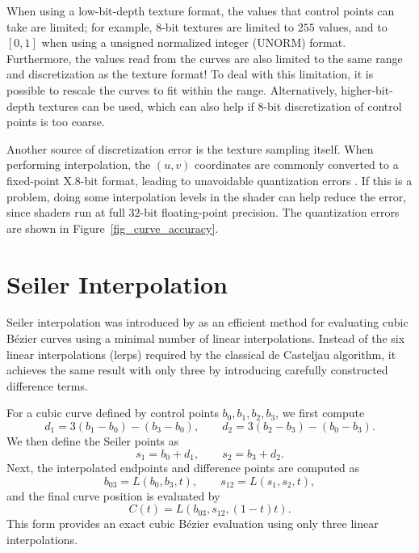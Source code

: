 \documentclass{jcgt}
\begin{document}
When using a low-bit-depth texture format, the values that control points can take are limited; for example, $8$-bit textures are limited to $255$ values, and to $[0,1]$ when using
a unsigned normalized integer (UNORM) format. Furthermore, the values read from the curves are also limited to the same range and discretization as the texture format! To deal with this limitation, it is possible to
rescale the curves to fit within the range. Alternatively, higher-bit-depth textures can be used, which can also help if $8$-bit discretization of control points is too coarse.

Another source of discretization error is the texture sampling itself. When performing interpolation, the $(u,v)$ coordinates are commonly converted to a fixed-point X.$8$-bit
format, leading to unavoidable quantization errors \cite{CUDA_PG}. If this is a problem, doing some interpolation levels in the shader can help reduce the error, since shaders run at full
$32$-bit floating-point precision. The quantization errors are shown in Figure~\ref{fig_curve_accuracy}.

\section{Seiler Interpolation}
Seiler interpolation was introduced by \citet{lin2021hardware} as an efficient method for evaluating cubic Bézier curves using a minimal number of linear interpolations. 
Instead of the six linear interpolations (lerps) required by the classical de Casteljau algorithm, it achieves the same result with only three by introducing carefully constructed difference terms.

For a cubic curve defined by control points \(b_0, b_1, b_2, b_3\), we first compute
\[
d_1 = 3(b_1 - b_0) - (b_3 - b_0), \qquad
d_2 = 3(b_2 - b_3) - (b_0 - b_3).
\]
We then define the Seiler points as
\[
s_1 = b_0 + d_1, \qquad s_2 = b_3 + d_2.
\]
Next, the interpolated endpoints and difference points are computed as
\[
b_{03} = L(b_0, b_3, t), \qquad
s_{12} = L(s_1, s_2, t),
\]
and the final curve position is evaluated by
\[
C(t) = L(b_{03}, s_{12}, (1-t)t).
\]
This form provides an exact cubic Bézier evaluation using only three linear interpolations.

\vspace{0.5em}
\end{document}
